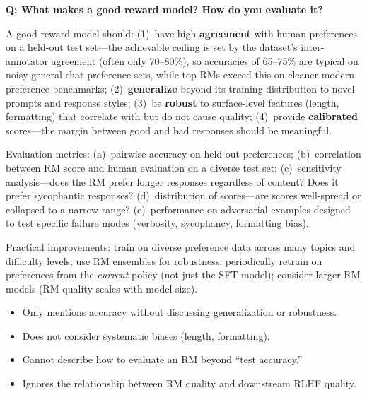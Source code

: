 \begin{interviewq}
\textbf{Q: What makes a good reward model?  How do you evaluate it?}

 \quad {} \quad
\badgefreq{\freqmed}

\stronganswer
A good reward model should: (1)~have high \textbf{agreement} with human
preferences on a held-out test set---the achievable ceiling is set by the
dataset's inter-annotator agreement (often only 70--80\%), so accuracies of
65--75\% are typical on noisy general-chat preference sets, while top RMs
exceed this on cleaner modern preference benchmarks; (2)~\textbf{generalize}
beyond its training distribution to novel prompts and response styles;
(3)~be \textbf{robust} to surface-level features (length, formatting) that
correlate with but do not cause quality; (4)~provide \textbf{calibrated}
scores---the margin between good and bad responses should be meaningful.

Evaluation metrics: (a)~pairwise accuracy on held-out preferences;
(b)~correlation between RM score and human evaluation on a diverse test set;
(c)~sensitivity analysis---does the RM prefer longer responses regardless
of content? Does it prefer sycophantic responses?  (d)~distribution of
scores---are scores well-spread or collapsed to a narrow range?
(e)~performance on adversarial examples designed to test specific failure
modes (verbosity, sycophancy, formatting bias).

Practical improvements: train on diverse preference data across many topics
and difficulty levels; use RM ensembles for robustness; periodically retrain
on preferences from the \emph{current} policy (not just the SFT model);
consider larger RM models (RM quality scales with model size).

\redflags
\begin{itemize}
\item Only mentions accuracy without discussing generalization or robustness.
\item Does not consider systematic biases (length, formatting).
\item Cannot describe how to evaluate an RM beyond ``test accuracy.''
\item Ignores the relationship between RM quality and downstream RLHF quality.
\end{itemize}



\end{interviewq}
